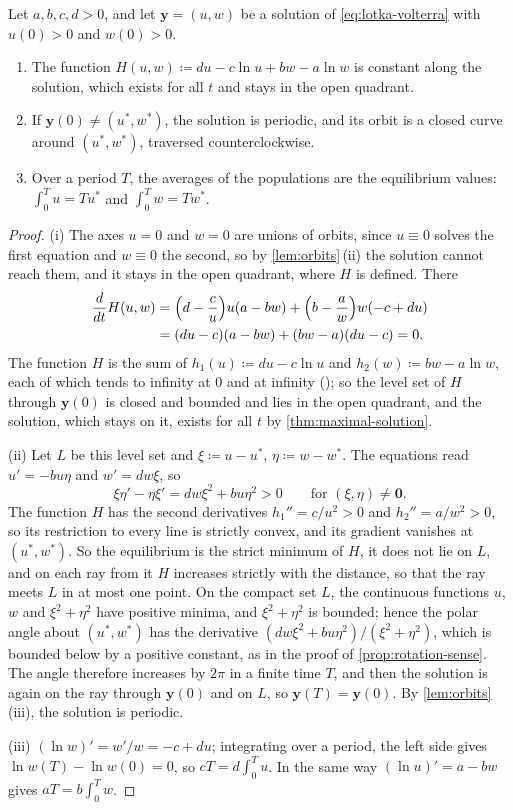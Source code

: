 \begin{proposition}
\label{prop:lotka-volterra}
Let $a,b,c,d>0$, and let $\mathbf y=(u,w)$ be a solution of \eqref{eq:lotka-volterra} with $u(0)>0$ and $w(0)>0$.
\begin{enumerate}
\item The function $H(u,w)\coloneqq du-c\ln u+bw-a\ln w$ is constant along the solution, which exists for all $t$ and stays in the open quadrant.
\item If $\mathbf y(0)\ne(u^*,w^*)$, the solution is periodic, and its orbit is a closed curve around $(u^*,w^*)$, traversed counterclockwise.
\item Over a period $T$, the averages of the populations are the equilibrium values: $\int_0^Tu=Tu^*$ and $\int_0^Tw=Tw^*$.
\end{enumerate}
\end{proposition}

\begin{proof}
(i) The axes $u=0$ and $w=0$ are unions of orbits, since $u\equiv0$ solves the first equation and $w\equiv0$ the second, so by \cref{lem:orbits}\,(ii) the solution cannot reach them, and it stays in the open quadrant, where $H$ is defined. There
\[
\begin{aligned}
\frac d{dt}H(u,w)&=\Bigl(d-\frac cu\Bigr)u(a-bw)+\Bigl(b-\frac aw\Bigr)w(-c+du)\\
&=(du-c)(a-bw)+(bw-a)(du-c)=0 .
\end{aligned}
\]
The function $H$ is the sum of $h_1(u)\coloneqq du-c\ln u$ and $h_2(w)\coloneqq bw-a\ln w$, each of which tends to infinity at $0$ and at infinity (); so the level set of $H$ through $\mathbf y(0)$ is closed and bounded and lies in the open quadrant, and the solution, which stays on it, exists for all $t$ by \cref{thm:maximal-solution}.

(ii) Let $L$ be this level set and $\xi\coloneqq u-u^*$, $\eta\coloneqq w-w^*$. The equations read $u'=-bu\eta$ and $w'=dw\xi$, so
\[
\xi\eta'-\eta\xi'=dw\xi^2+bu\eta^2>0\qquad\text{for }(\xi,\eta)\ne\mathbf 0 .
\]
The function $H$ has the second derivatives $h_1''=c/u^2>0$ and $h_2''=a/w^2>0$, so its restriction to every line is strictly convex, and its gradient vanishes at $(u^*,w^*)$. So the equilibrium is the strict minimum of $H$, it does not lie on $L$, and on each ray from it $H$ increases strictly with the distance, so that the ray meets $L$ in at most one point. On the compact set $L$, the continuous functions $u$, $w$ and $\xi^2+\eta^2$ have positive minima, and $\xi^2+\eta^2$ is bounded; hence the polar angle about $(u^*,w^*)$ has the derivative $(dw\xi^2+bu\eta^2)/(\xi^2+\eta^2)$, which is bounded below by a positive constant, as in the proof of \cref{prop:rotation-sense}. The angle therefore increases by $2\pi$ in a finite time $T$, and then the solution is again on the ray through $\mathbf y(0)$ and on $L$, so $\mathbf y(T)=\mathbf y(0)$. By \cref{lem:orbits}\,(iii), the solution is periodic.

(iii) $(\ln w)'=w'/w=-c+du$; integrating over a period, the left side gives $\ln w(T)-\ln w(0)=0$, so $cT=d\int_0^Tu$. In the same way $(\ln u)'=a-bw$ gives $aT=b\int_0^Tw$.
\end{proof}

